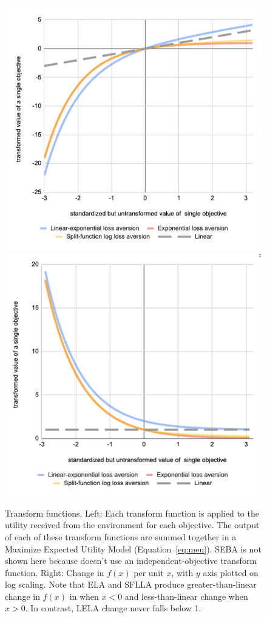 \begin{figure}[h]
 
  \includegraphics[width=\columnwidth]{output/transform_graph_2d.png}
  \includegraphics[width=\columnwidth]{output/transform_graph_2d_integral.png}
  \caption{Transform functions. Left: Each transform function is applied to the utility received from the environment for each objective. The output of each of these transform functions are summed together in a Maximize Expected Utility Model (Equation~\ref{eq:meu}). SEBA is not shown here because doesn't use an independent-objective transform function. Right: Change in $f(x)$ per unit $x$, with $y$ axis plotted on log scaling. Note that ELA and SFLLA produce greater-than-linear change in $f(x)$ in when $x<0$ and less-than-linear change when $x>0$. In contrast, LELA change never falls below 1.}
  \label{fig:transform_functions}
\end{figure}
